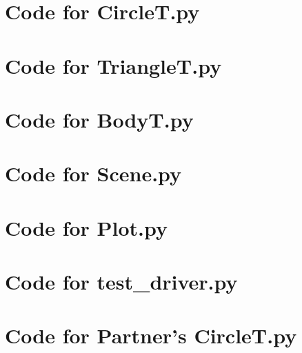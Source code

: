 \documentclass[12pt]{article}
\begin{document}
\noindent 

\newpage

\section{Code for CircleT.py}

\noindent 

\newpage

\section{Code for TriangleT.py}

\noindent 

\newpage

\section{Code for BodyT.py}

\noindent 

\newpage

\section{Code for Scene.py}

\noindent 

\newpage

\section{Code for Plot.py}

\noindent 

\newpage

\section{Code for test\_driver.py}

\noindent 

\newpage

\section{Code for Partner's CircleT.py}

\noindent 
\end{document}
